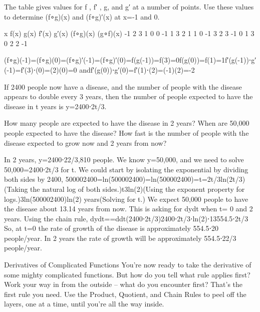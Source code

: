 \begin{example}
The table gives values for f , f′ , g, and g′ at a number of points. Use these values to determine (f∘g)(x) and (f∘g)′(x) at x=-1 and 0.

x	f(x)	g(x)	f′(x)	g′(x)	(f∘g)(x)	(g∘f)(x)	-1	2	3	1	0			0	-1	1	3	2			1	1	0	-1	3			2	3	-1	0	1			3	0	2	2	-1
\begin{solution} (f∘g)(-1)=(f∘g)(0)=(f∘g)′(-1)=(f∘g)′(0)=f(g(-1))=f(3)=0f(g(0))=f(1)=1f′(g(-1))⋅g′(-1)=f′(3)⋅(0)=(2)(0)=0 andf′(g(0))⋅g′(0)=f′(1)⋅(2)=(-1)(2)=-2
\end{solution}\end{example}

\begin{example}
If 2400 people now have a disease, and the number of people with the disease appears to double every 3 years, then the number of people expected to have the disease in t years is y=2400⋅2t/3.

How many people are expected to have the disease in 2 years?
When are 50,000 people expected to have the disease?
How fast is the number of people with the disease expected to grow now and 2 years from now?
\begin{solution} In 2 years, y=2400⋅22/3,810 people.
We know y=50,000, and we need to solve 50,000=2400⋅2t/3 for t. We could start by isolating the exponential by dividing both sides by 2400,
500002400=ln(500002400)=ln(500002400)=t=2t/3ln(2t/3)(Taking the natural log of both sides.)t3ln(2)(Using the exponent property for logs.)3ln(500002400)ln(2) years(Solving for t.)
We expect 50,000 people to have the disease about 13.14 years from now.
This is asking for dydt when t= 0 and 2 years. Using the chain rule,
dydt==\approx   ddt(2400⋅2t/3)2400⋅2t/3⋅ln(2)⋅13554.5⋅2t/3
So, at t=0 the rate of growth of the disease is approximately 554.5⋅20 people/year. In 2 years the rate of growth will be approximately 554.5⋅22/3 people/year.
\end{solution}\end{example}

Derivatives of Complicated Functions
You're now ready to take the derivative of some mighty complicated functions. But how do you tell what rule applies first? Work your way in from the outside – what do you encounter first? That’s the first rule you need. Use the Product, Quotient, and Chain Rules to peel off the layers, one at a time, until you’re all the way inside.

